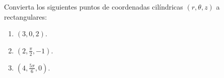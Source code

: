 Convierta los siguientes puntos de coordenadas cilíndricas $(r,\theta,z)$ a rectangulares:
\begin{enumerate}
    \item $(3,0,2)$.
    \item $\left(2,\frac{\pi}{2},-1\right)$.
    \item $\left(4,\frac{5\pi}{6},0\right)$.
\end{enumerate}
